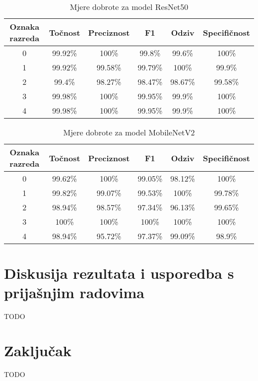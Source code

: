 \documentclass[conference, utf8]{IEEEtran}
\begin{document}
\begin{table}[ht]
	\centering
	\caption{Mjere dobrote za model ResNet50}
	\label{table:4}
	\begin{tabular}{ |c|c|c|c|c|c| } 
		\hline
		Oznaka razreda & Točnost & Preciznost & F1 & Odziv & Specifičnost \\
		\hline\hline
		  0 & 99.92\% & 100\% & 99.8\% & 99.6\% & 100\% \\
									\hline
									  1 & 99.92\% & 99.58\% & 99.79\% & 100\% & 99.9\% \\
									 \hline
									  2 & 99.4\% & 98.27\% & 98.47\% & 98.67\% & 99.58\% \\
									 \hline
									  3 & 99.98\% & 100\% & 99.95\% & 99.9\% & 100\% \\
									 \hline
									  4 & 99.98\% & 100\% & 99.95\% & 99.9\% & 100\% \\
									 \hline
	\end{tabular}
\end{table}
\begin{table}[ht]
	\centering
	\caption{Mjere dobrote za model MobileNetV2}
	\label{table:5}
	\begin{tabular}{ |c|c|c|c|c|c| } 
		\hline
		Oznaka razreda & Točnost & Preciznost & F1 & Odziv & Specifičnost \\
		\hline\hline
		0 & 99.62\% & 100\% & 99.05\% & 98.12\% & 100\% \\
		\hline
		1 & 99.82\% & 99.07\% & 99.53\% & 100\% & 99.78\% \\
		\hline
		2 & 98.94\% & 98.57\% & 97.34\% & 96.13\% & 99.65\% \\
		\hline
		3 & 100\% & 100\% & 100\% & 100\% & 100\% \\
		\hline
		4 & 98.94\% & 95.72\% & 97.37\% & 99.09\% & 98.9\% \\
		\hline
	\end{tabular}
\end{table}




\section{Diskusija rezultata i usporedba s prijašnjim radovima}
TODO



\section{Zaključak}
TODO



\end{document}
